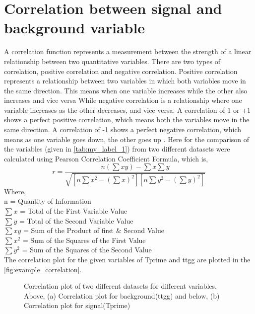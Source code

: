 \section{Correlation between signal and background variable}
A correlation function represents a measurement between the strength of a linear relationship between two quantitative variables. There are two types of correlation, positive correlation and negative correlation. Positive correlation represents a relationship between two variables in which both variables move in the same direction. This means when one variable increases while the other also increases and vice versa While negative correlation is a relationship where one variable increases as the other decreases, and vice versa. A correlation of 1 or +1 shows a perfect positive correlation, which means both the variables move in the same direction. A correlation of -1 shows a perfect negative correlation, which means as one variable goes down, the other goes up \cite{27}. Here for the comparison of the variables (given in \autoref{tab:my_label_1}) from two different datasets were calculated using Pearson Correlation Coefficient Formula, which is,
\begin{equation}
    r = \frac{n(\sum xy)- \sum x \sum y}{\sqrt{[n \sum x^2 - (\sum x)^2][n \sum y^2 - (\sum y)^2]}}
\end{equation}
Where,\\
n = Quantity of Information \\
$\sum x$ = Total of the First Variable Value \\
$\sum y$ = Total of the Second Variable Value\\
$\sum xy$ = Sum of the Product of first \& Second Value\\
$\sum x^2$ = Sum of the Squares of the First Value\\
$\sum y^2$ = Sum of the Squares of the Second Value\\

The correlation plot for the given variables of Tprime and ttgg are plotted in the \autoref{fig:example_correlation}.
  \begin{figure}[H]
    \centering
    \qquad
    \caption{Correlation plot of two different datasets for different variables. Above, (a) Correlation plot for background(ttgg) and below, (b) Correlation plot for signal(Tprime)}
    \label{fig:example_correlation}
\end{figure}

